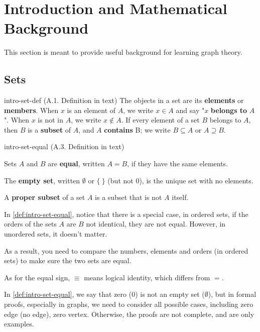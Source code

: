 \documentclass[../src/handouts/main.tex]{subfiles}
\begin{document}
\section{Introduction and Mathematical Background}

This section is meant to provide useful background for learning graph theory.

\subsection{Sets}

\begin{definition}{}{intro-set-def}
  (A.1. Definition in text)
  The objects in a set are its \textbf{elements} or \textbf{members}.
  When $x$ is an element of $A$, we write $x \in A$ and say "$x$ \textbf{belongs to} $A$".
  When $x$ is not in $A$, we write $x \notin A$.
  If every element of a set $B$ belongs to $A$, then $B$ is a \textbf{subset} of $A$, and $A$ \textbf{contains} B; we write $B \subseteq A$ or $A \supseteq B$.
\end{definition}

\begin{definition}{}{intro-set-equal}
  (A.3. Definition in text)

  Sets $A$ and $B$ are \textbf{equal}, written $A = B$, if they have the same elements.

  The \textbf{empty set}, written $\emptyset$ or $\lbrace\ \rbrace$ (but not 0), is the unique set with no elements.

  A \textbf{proper subset} of a set $A$ is a subset that is not $A$ itself.
\end{definition}

In \cref{def:intro-set-equal}, notice that there is a special case, in ordered sets, if the orders of the sets $A$ are $B$ not identical, they are not equal. However, in unordered sets, it doesn't matter.

As a result, you need to compare the numbers, elements and orders (in ordered sets) to make sure the two sets are equal.

As for the equal sign, $\equiv$ means logical identity, which differs from $=$.

In \cref{def:intro-set-equal}, we say that zero (0) is not an empty set ($\emptyset$), but in formal proofs, especially in graphs, we need to consider all possible cases, including zero edge (no edge), zero vertex. Otherwise, the proofs are not complete, and are only examples.
\end{document}

